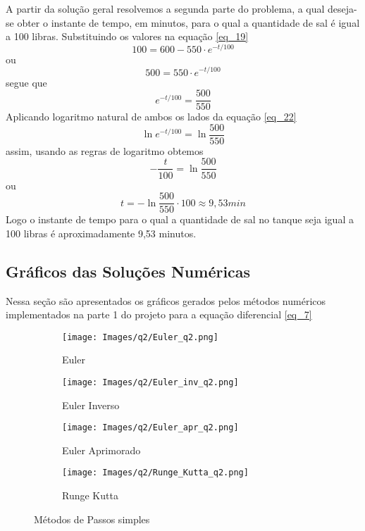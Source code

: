 \documentclass[12pt]{article}
\begin{document}
A partir da solução geral resolvemos a segunda parte do problema, a qual deseja-se obter o instante de tempo, em minutos, para o qual a quantidade de sal é igual a 100 libras. Substituindo os valores na equação \ref{eq_19}
\begin{equation}
    100 = 600 - 550 \cdot e^{-t/100}
\end{equation}
ou
\begin{equation}
    500 = 550 \cdot e^{-t/100}
\end{equation}
segue que
\begin{equation}
    e^{-t/100} = \frac{500}{550}
\label{eq_22}
\end{equation}
Aplicando logaritmo natural de ambos os lados da equação \ref{eq_22}
\begin{equation}
    \ln{e^{-t/100}} = \ln{\frac{500}{550}}
\end{equation}
assim, usando as regras de logaritmo obtemos
\begin{equation}
    -\frac{t}{100} = \ln{\frac{500}{550}}
\end{equation}
ou
\begin{equation}
    {t} = -\ln{\frac{500}{550}} \cdot 100 \approx 9,53min
\end{equation}
Logo o instante de tempo para o qual a quantidade de sal no tanque seja igual a 100 libras é aproximadamente 9,53 minutos.
\subsection{Gráficos das Soluções Numéricas}
Nessa seção são apresentados os gráficos gerados pelos métodos numéricos implementados na parte 1 do projeto para a equação diferencial \ref{eq_7}
\begin{figure}[H]
\begin{subfigure}{.5\textwidth}
  \centering
  \texttt{[image: Images/q2/Euler\_q2.png]}  
  \caption{Euler}
\end{subfigure}
\begin{subfigure}{.5\textwidth}
  \centering
  \texttt{[image: Images/q2/Euler\_inv\_q2.png]}  
  \caption{Euler Inverso}
\end{subfigure}

\newline

\begin{subfigure}{.5\textwidth}
  \centering
  \texttt{[image: Images/q2/Euler\_apr\_q2.png]}  
  \caption{Euler Aprimorado}
\end{subfigure}
\begin{subfigure}{.5\textwidth}
  \centering
  \texttt{[image: Images/q2/Runge\_Kutta\_q2.png]}  
  \caption{Runge Kutta}
\end{subfigure}
\caption{Métodos de Passos simples}
\end{figure}
\end{document}

